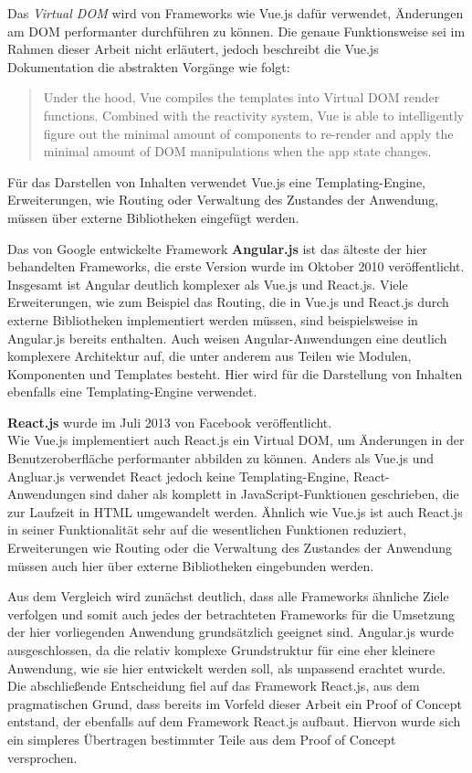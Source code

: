 Das \textit{Virtual DOM} wird von Frameworks wie Vue.js dafür verwendet, Änderungen am DOM performanter durchführen zu können. Die genaue Funktionsweise sei im Rahmen dieser Arbeit nicht erläutert, jedoch beschreibt die Vue.js Dokumentation die abstrakten Vorgänge wie folgt:

\begin{quote}
  Under the hood, Vue compiles the templates into Virtual DOM render functions. Combined with the reactivity system, Vue is able to intelligently figure out the minimal amount of components to re-render and apply the minimal amount of DOM manipulations when the app state changes. \cite{VueTemplate}
\end{quote}

Für das Darstellen von Inhalten verwendet Vue.js eine Templating-Engine, Erweiterungen, wie Routing oder Verwaltung des Zustandes der Anwendung, müssen über externe Bibliotheken eingefügt werden.

Das von Google entwickelte Framework \textbf{Angular.js} \cite{angular} ist das älteste der hier behandelten Frameworks, die erste Version wurde im Oktober 2010 veröffentlicht.\\
Insgesamt ist Angular deutlich komplexer als Vue.js und React.js. Viele Erweiterungen, wie zum Beispiel das Routing, die in Vue.js und React.js durch externe Bibliotheken implementiert werden müssen, sind beispielsweise in Angular.js bereits enthalten.
Auch weisen Angular-Anwendungen eine deutlich komplexere Architektur auf, die unter anderem aus Teilen wie Modulen, Komponenten und Templates besteht. Hier wird für die Darstellung von Inhalten ebenfalls eine Templating-Engine verwendet.

\textbf{React.js} \cite{react} wurde im Juli 2013 von Facebook veröffentlicht.\\
Wie Vue.js implementiert auch React.js ein Virtual DOM, um Änderungen in der Benutzeroberfläche performanter abbilden zu können.
Anders als Vue.js und Angluar.js verwendet React jedoch keine Templating-Engine, React-Anwendungen sind daher als komplett in JavaScript-Funktionen geschrieben, die zur Laufzeit in HTML umgewandelt werden.
Ähnlich wie Vue.js ist auch React.js in seiner Funktionalität sehr auf die wesentlichen Funktionen reduziert, Erweiterungen wie Routing oder die Verwaltung des Zustandes der Anwendung müssen auch hier über externe Bibliotheken eingebunden werden.

Aus dem Vergleich wird zunächst deutlich, dass alle Frameworks ähnliche Ziele verfolgen und somit auch jedes der betrachteten Frameworks für die Umsetzung der hier vorliegenden Anwendung grundsätzlich geeignet sind.
Angular.js wurde ausgeschlossen, da die relativ komplexe Grundstruktur für eine eher kleinere Anwendung, wie sie hier entwickelt werden soll, als unpassend erachtet wurde.
Die abschließende Entscheidung fiel auf das Framework React.js, aus dem pragmatischen Grund, dass bereits im Vorfeld dieser Arbeit ein Proof of Concept entstand, der ebenfalls auf dem Framework React.js aufbaut. Hiervon wurde sich ein simpleres Übertragen bestimmter Teile aus dem Proof of Concept versprochen.


